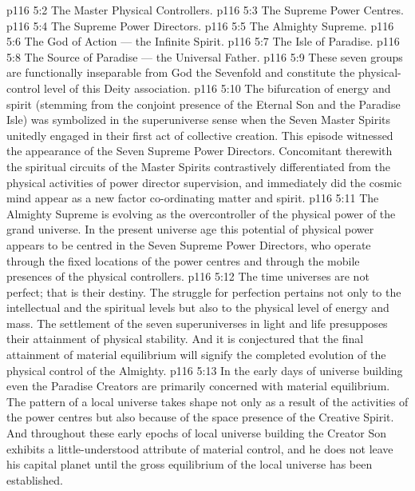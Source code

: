 \vs p116 5:2 \bibnobreakspace The Master Physical Controllers.
\vs p116 5:3 \bibnobreakspace The Supreme Power Centres.
\vs p116 5:4 \bibnobreakspace The Supreme Power Directors.
\vs p116 5:5 \bibnobreakspace The Almighty Supreme.
\vs p116 5:6 \bibnobreakspace The God of Action --- the Infinite Spirit.
\vs p116 5:7 \bibnobreakspace The Isle of Paradise.
\vs p116 5:8 \bibnobreakspace The Source of Paradise --- the Universal Father.
\vs p116 5:9 These seven groups are functionally inseparable from God the Sevenfold and constitute the physical\hyp{}control level of this Deity association.
\vs p116 5:10 \pc The bifurcation of energy and spirit (stemming from the conjoint presence of the Eternal Son and the Paradise Isle) was symbolized in the superuniverse sense when the Seven Master Spirits unitedly engaged in their first act of collective creation. This episode witnessed the appearance of the Seven Supreme Power Directors. Concomitant therewith the spiritual circuits of the Master Spirits contrastively differentiated from the physical activities of power director supervision, and immediately did the cosmic mind appear as a new factor co\hyp{}ordinating matter and spirit.
\vs p116 5:11 The Almighty Supreme is evolving as the overcontroller of the physical power of the grand universe. In the present universe age this potential of physical power appears to be centred in the Seven Supreme Power Directors, who operate through the fixed locations of the power centres and through the mobile presences of the physical controllers.
\vs p116 5:12 \pc The time universes are not perfect; that is their destiny. The struggle for perfection pertains not only to the intellectual and the spiritual levels but also to the physical level of energy and mass. The settlement of the seven superuniverses in light and life presupposes their attainment of physical stability. And it is conjectured that the final attainment of material equilibrium will signify the completed evolution of the physical control of the Almighty.
\vs p116 5:13 In the early days of universe building even the Paradise Creators are primarily concerned with material equilibrium. The pattern of a local universe takes shape not only as a result of the activities of the power centres but also because of the space presence of the Creative Spirit. And throughout these early epochs of local universe building the Creator Son exhibits a little\hyp{}understood attribute of material control, and he does not leave his capital planet until the gross equilibrium of the local universe has been established.
